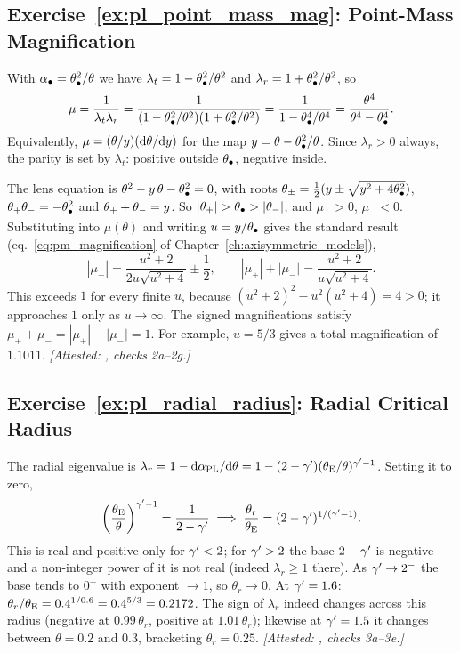 \subsection*{Exercise~\ref{ex:pl_point_mass_mag}: Point-Mass Magnification}

With $\alpha_\bullet=\theta_{\bullet}^2/\theta$ we have
$\lambda_t=1-\theta_{\bullet}^2/\theta^2$ and $\lambda_r=1+\theta_{\bullet}^2/\theta^2$, so
\begin{equation*}
    \mu=\frac{1}{\lambda_t\lambda_r}
      =\frac{1}{(1-\theta_{\bullet}^2/\theta^2)(1+\theta_{\bullet}^2/\theta^2)}
      =\frac{1}{1-\theta_{\bullet}^4/\theta^4}
      =\frac{\theta^4}{\theta^4-\theta_{\bullet}^4} .
\end{equation*}
Equivalently, $\mu=(\theta/y)(\dd\theta/\dd y)$ for the map
$y=\theta-\theta_{\bullet}^2/\theta$.  Since $\lambda_r>0$ always, the
parity is set by $\lambda_t$: positive outside $\theta_{\bullet}$, negative
inside.

The lens equation is $\theta^2-y\,\theta-\theta_{\bullet}^2=0$, with roots
$\theta_\pm=\tfrac12(y\pm\sqrt{y^2+4\theta_{\bullet}^2})$,
$\theta_+\theta_-=-\theta_{\bullet}^2$ and $\theta_++\theta_-=y$.  So
$|\theta_+|>\thetaBH>|\theta_-|$, and $\mu_+>0$, $\mu_-<0$.
Substituting into $\mu(\theta)$ and writing $u=y/\theta_{\bullet}$ gives
the standard result (eq.~\ref{eq:pm_magnification} of
Chapter~\ref{ch:axisymmetric_models}),
\begin{equation*}
    |\mu_\pm|=\frac{u^2+2}{2u\sqrt{u^2+4}}\pm\frac12 ,
    \qquad
    |\mu_+|+|\mu_-|=\frac{u^2+2}{u\sqrt{u^2+4}} .
\end{equation*}
This exceeds $1$ for every finite $u$, because
$(u^2+2)^2-u^2(u^2+4)=4>0$; it approaches $1$ only as $u\to\infty$.
The signed magnifications satisfy $\mu_++\mu_-=|\mu_+|-|\mu_-|=1$.
For example, $u=5/3$ gives a total magnification of $1.1011$.
\emph{[Attested: , checks 2a--2g.]}

\subsection*{Exercise~\ref{ex:pl_radial_radius}: Radial Critical Radius}

The radial eigenvalue is
$\lambda_r=1-\dd\alpha_{\rm PL}/\dd\theta=1-(2-\gamma')(\theta_{\mathrm{E}}/\theta)^{\gamma'-1}$.
Setting it to zero,
\begin{equation*}
    \left(\frac{\theta_{\mathrm{E}}}{\theta}\right)^{\gamma'-1}=\frac{1}{2-\gamma'}
    \;\Longrightarrow\;
    \frac{\theta_r}{\theta_{\mathrm{E}}}=(2-\gamma')^{1/(\gamma'-1)} .
\end{equation*}
This is real and positive only for $\gamma'<2$; for $\gamma'>2$ the base
$2-\gamma'$ is negative and a non-integer power of it is not real (indeed
$\lambda_r\ge1$ there).  As $\gamma'\to2^-$ the base tends to $0^+$ with
exponent $\to1$, so $\theta_r\to0$.  At $\gamma'=1.6$:
$\theta_r/\theta_{\mathrm{E}}=0.4^{1/0.6}=0.4^{5/3}=0.2172$.  The sign of
$\lambda_r$ indeed changes across this radius (negative at
$0.99\,\theta_r$, positive at $1.01\,\theta_r$); likewise at $\gamma'=1.5$
it changes between $\theta=0.2$ and $0.3$, bracketing $\theta_r=0.25$.
\emph{[Attested: , checks 3a--3e.]}

